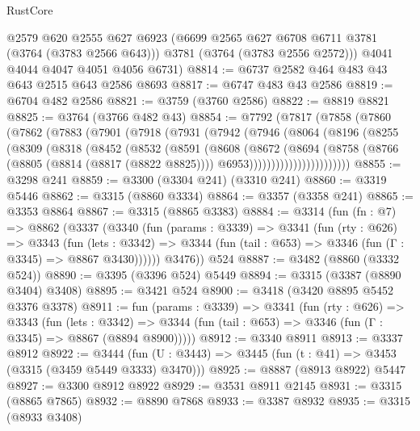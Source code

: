 \begin{lexlean}{RustCore}
\begin{coremodule}
        @2579
        @620
        @2555
        @627
        @6923
        (@6699 @2565 @627 @6708 @6711 @3781 (@3764 (@3783 @2566 @643)))
        @3781
        (@3764 (@3783 @2556 @2572)))
      @4041
      @4044
      @4047
      @4051
      @4056
      @6731)
@8814 := @6737 @2582 @464 @483 @43 @643 @2515 @643 @2586 @8693
@8817 := @6747 @483 @43 @2586
@8819 := @6704 @482 @2586
@8821 := @3759 (@3760 @2586)
@8822 := @8819 @8821
@8825 := @3764 (@3766 @482 @43)
@8854 := @7792
    (@7817
      (@7858
        (@7860
          (@7862
            (@7883
              (@7901
                (@7918
                  (@7931
                    (@7942
                      (@7946
                        (@8064
                          (@8196
                            (@8255
                              (@8309
                                (@8318
                                  (@8452
                                    (@8532
                                      (@8591
                                        (@8608
                                          (@8672
                                            (@8694
                                              (@8758
                                                (@8766
                                                  (@8805 (@8814 (@8817 (@8822 @8825))))
                                                  @6953)))))))))))))))))))))))
@8855 := @3298 @241
@8859 := @3300 (@3304 @241) (@3310 @241)
@8860 := @3319 @5446
@8862 := @3315 (@8860 @3334)
@8864 := @3357 (@3358 @241)
@8865 := @3353 @8864
@8867 := @3315 (@8865 @3383)
@8884 := @3314
    (fun (fn : @7) =>
    @8862
      (@3337
        (@3340
          (fun (params : @3339) =>
          @3341
            (fun (rty : @626) =>
            @3343
              (fun (lets : @3342) =>
              @3344 (fun (tail : @653) => @3346 (fun (Γ : @3345) => @8867 @3430))))))
        @3476))
    @524
@8887 := @3482 (@8860 (@3332 @524))
@8890 := @3395 (@3396 @524) @5449
@8894 := @3315 (@3387 (@8890 @3404) @3408)
@8895 := @3421 @524
@8900 := @3418 (@3420 @8895 @5452 @3376 @3378)
@8911 := fun (params : @3339) =>
  @3341
    (fun (rty : @626) =>
    @3343
      (fun (lets : @3342) =>
      @3344 (fun (tail : @653) => @3346 (fun (Γ : @3345) => @8867 (@8894 @8900)))))
@8912 := @3340 @8911
@8913 := @3337 @8912
@8922 := @3444 (fun (U : @3443) => @3445 (fun (t : @41) => @3453 (@3315 (@3459 @5449 @3333) @3470)))
@8925 := @8887 (@8913 @8922) @5447
@8927 := @3300 @8912 @8922
@8929 := @3531 @8911 @2145
@8931 := @3315 (@8865 @7865)
@8932 := @8890 @7868
@8933 := @3387 @8932
@8935 := @3315 (@8933 @3408)

\end{coremodule}
\end{lexlean}
